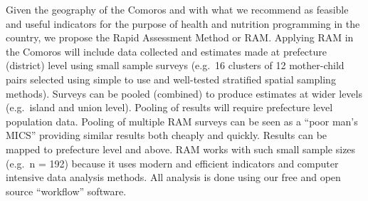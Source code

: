 \documentclass[12pt,a4paper]{article}
\begin{document}
Given the geography of the Comoros and with what we recommend as feasible and useful indicators for the purpose of health and nutrition programming in the country, we propose the Rapid Assessment Method or RAM. Applying RAM in the Comoros will include data collected and estimates made at prefecture (district) level using small sample surveys (e.g.~16 clusters of 12 mother-child pairs selected using simple to use and well-tested stratified spatial sampling methods). Surveys can be pooled (combined) to produce estimates at wider levels (e.g.~island and union level). Pooling of results will require prefecture level population data. Pooling of multiple RAM surveys can be seen as a ``poor man's MICS'' providing similar results both cheaply and quickly. Results can be mapped to prefecture level and above. RAM works with such small sample sizes (e.g.~n = 192) because it uses modern and efficient indicators and computer intensive data analysis methods. All analysis is done using our free and open source ``workflow'' software.

~
\end{document}
